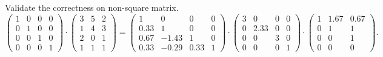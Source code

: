 \documentclass[
  course = {{16-811 Math Fundamentals for Robotics}},
  quartile = {{1}},
  assignment = 1,
  name = {{Kangle Deng}},
  email = {{kangled@andrew.cmu.edu}},
  firstexercise = 1
]{aga-homework}
\begin{document}
\subexercise
Validate the correctness on non-square matrix.
\begin{equation*}
    \left(
    \begin{array}{cccc}
        1 & 0 & 0 & 0 \\
        0 & 1 & 0 & 0 \\
        0 & 0 & 1 & 0 \\
        0 & 0 & 0 & 1
    \end{array}
    \right) \cdot
    \left(
    \begin{array}{ccc}
        3 & 5 & 2 \\
        1 & 4 & 3 \\
        2 & 0 & 1 \\
        1 & 1 & 1
    \end{array}
    \right) =
    \left(
    \begin{array}{cccc}
        1 & 0 & 0 & 0 \\
        0.33 & 1 & 0 & 0 \\
        0.67 & -1.43 & 1 & 0 \\
        0.33 & -0.29 & 0.33 & 1
    \end{array}
    \right) \cdot
    \left(
    \begin{array}{cccc}
        3 & 0 & 0 & 0 \\
        0 & 2.33 & 0 & 0 \\
        0 & 0 & 3 & 0 \\
        0 & 0 & 0 & 1
    \end{array}
    \right) \cdot
    \left(
    \begin{array}{ccc}
        1 & 1.67 & 0.67 \\
        0 & 1 & 1 \\
        0 & 0 & 1 \\
        0 & 0 & 0
    \end{array}
    \right).
\end{equation*}
\end{document}
